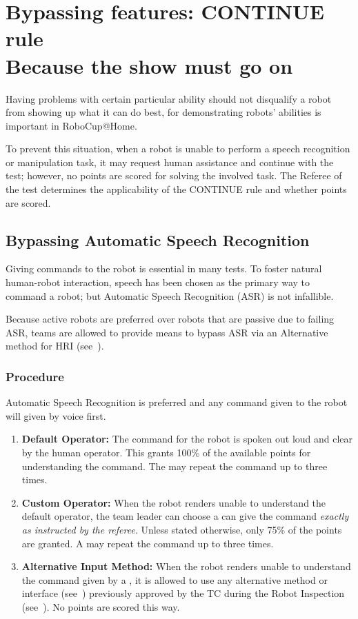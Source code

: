 
\section[CONTINUE rules]{Bypassing features: CONTINUE rule \\ \small Because the show must go on}
\label{rule:continue}
Having problems with certain particular ability should not disqualify a robot from showing up what it can do best, for demonstrating robots' abilities is important in RoboCup@Home.

To prevent this situation, when a robot is unable to perform a
speech recognition
or manipulation
task, it may request human assistance and continue with the test; however, no points are scored for solving the involved task. The Referee of the test determines the applicability of the CONTINUE rule and whether points are scored.

\subsection{Bypassing Automatic Speech Recognition}
\label{rule:asrcontinue}
Giving commands to the robot is essential in many tests. To foster natural human-robot interaction, speech has been chosen as the primary way to command a robot; but Automatic Speech Recognition (ASR) is not infallible.

Because active robots are preferred over robots that are passive due to failing ASR, teams are allowed to provide means to bypass ASR via an Alternative method for HRI (see~).

\subsubsection{Procedure}
Automatic Speech Recognition is preferred and any command given to the robot will given by voice first.
\begin{enumerate}
	\item \textbf{Default Operator:} The command for the robot is spoken out loud and clear by the human operator. This grants 100\% of the available points for understanding the command. The  may repeat the command up to three times.

	\item \textbf{Custom Operator:} When the robot renders unable to understand the default operator, the team leader can choose a  can give the command \emph{exactly as instructed by the referee}. Unless stated otherwise, only 75\% of the points are granted. A  may repeat the command up to three times.

	\item \textbf{Alternative Input Method:} When the robot renders unable to understand the command given by a , it is allowed to use any alternative method or interface (see~) previously approved by the TC during the Robot Inspection (see~). No points are scored this way.
\end{enumerate}


